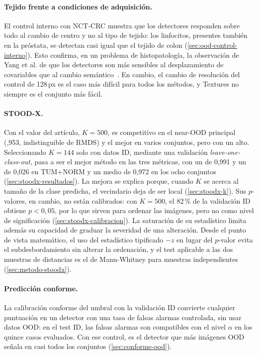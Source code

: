 \paragraph{Tejido frente a condiciones de adquisición.} El control interno con NCT-CRC muestra que los detectores responden sobre todo al cambio de centro y no al tipo de tejido: los linfocitos, presentes también en la próstata, se detectan casi igual que el tejido de colon (\cref{sec:ood-control-interno}). Esto confirma, en un problema de histopatología, la observación de Yang et al. de que los detectores son más sensibles al desplazamiento de covariables que al cambio semántico~\cite{yang2024}. En cambio, el cambio de resolución del control de 128\,px es el caso más difícil para todos los métodos, y Textures no siempre es el conjunto más fácil.

\paragraph{STOOD-X.} Con el valor del artículo, $K = 500$, \stoodx es competitivo en el near-OOD principal (,953, indistinguible de RMDS) y el mejor en varios conjuntos, pero con un  alto. Seleccionando $K = 144$ solo con datos ID, mediante una validación \emph{leave-one-class-out}, pasa a ser el mejor método en las tres métricas, con un \AUROC de 0,991 y un  de 0,026 en TUM+NORM y un \AUROC medio de 0,972 en los ocho conjuntos (\cref{sec:stoodx-resultados}). La mejora se explica porque, cuando $K$ se acerca al tamaño de la clase predicha, el vecindario deja de ser local (\cref{sec:stoodx-k}). Sus $p$-valores, en cambio, no están calibrados: con $K = 500$, el 82\,\% de la validación ID obtiene $p < 0{,}05$, por lo que sirven para ordenar las imágenes, pero no como nivel de significación (\cref{sec:stoodx-calibracion}). La saturación de su estadístico limita además su capacidad de graduar la severidad de una alteración. Desde el punto de vista matemático, el uso del estadístico tipificado $-z$ en lugar del $p$-valor evita el subdesbordamiento sin alterar la ordenación, y el test aplicable a las dos muestras de distancias es el de Mann-Whitney para muestras independientes (\cref{sec:metodo-stoodx}).


\paragraph{Predicción conforme.} La calibración conforme del umbral con la validación ID convierte cualquier puntuación en un detector con una tasa de falsas alarmas controlada, sin usar datos OOD: en el test ID, las falsas alarmas son compatibles con el nivel $\alpha$ en los quince casos evaluados. Con ese control, \stoodx es el detector que más imágenes OOD señala en casi todos los conjuntos (\cref{sec:conforme-ood}).

